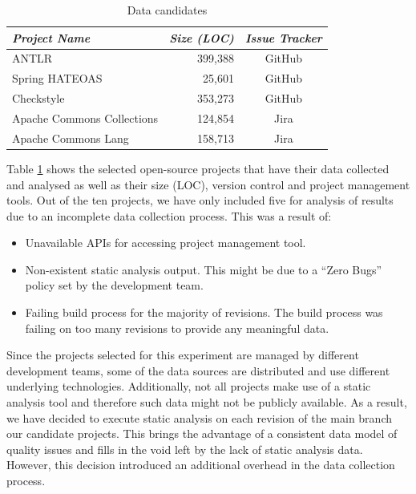 \documentclass{mpaper}
\begin{document}
\begin{table}
	\begin{tabular}{|l|r|c|}
    \hline
		\emph{Project Name}        & \emph{Size (LOC)} & \emph{Issue Tracker}  \\ \hline \hline
		ANTLR                      & 399,388            & GitHub               \\ \hline
		Spring HATEOAS             & 25,601             & GitHub               \\ \hline
		Checkstyle                 & 353,273            & GitHub               \\ \hline
		Apache Commons Collections & 124,854            & Jira                 \\ \hline
		Apache Commons Lang        & 158,713            & Jira                 \\ \hline
	\end{tabular}
	\caption{\label{tab-data-candidates} Data candidates}
\end{table}

Table \ref{tab-data-candidates} shows the selected open-source projects that have their data
collected and analysed as well as their size (LOC), version control and project
management tools. Out of the ten projects, we have only included five for
analysis of results due to an incomplete data collection process. This was a
result of:

\begin{itemize}
  \item Unavailable APIs for accessing project management tool.
  \item Non-existent static analysis output. This might be due to a ``Zero
  Bugs'' policy set by the development team.
  \item Failing build process for the majority of revisions. The build process
  was failing on too many revisions to provide any meaningful data.
\end{itemize}

Since the projects selected for this experiment are managed by different
development teams, some of the data sources are distributed and use different
underlying technologies. Additionally, not all projects make use of a static
analysis tool and therefore such data might not be publicly available. As a
result, we have decided to execute static analysis on each revision of the main
branch our candidate projects. This brings the advantage of a consistent data
model of quality issues and fills in the void left by the lack of static
analysis data. However, this decision introduced an additional overhead in the
data collection process.
\end{document}
